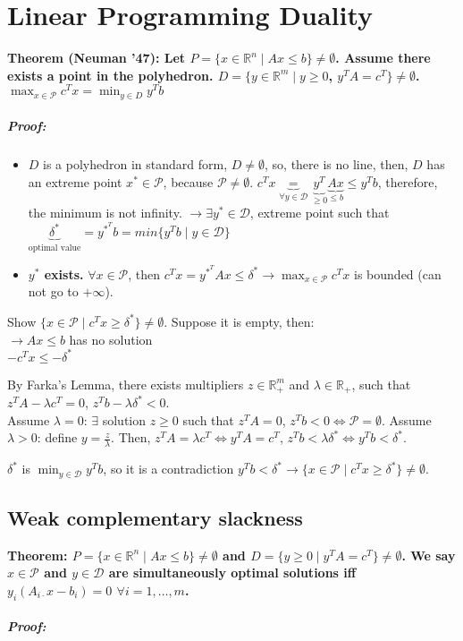 \documentclass[main]{subfiles}
\begin{document}

\section{Linear Programming Duality}

\textbf{Theorem (Neuman '47): Let $P = \{x \in \mathbb{R}^n \mid Ax \leq b \}
\neq \emptyset$. Assume there exists a point in the polyhedron. $D = \{ y \in
\mathbb{R}^m \mid y \geq 0$, $y^TA = c^T\} \neq \emptyset$.
\emph{$\displaystyle \max_{x \in \mathcal{P}} c^{T}x = \min_{y \in D} y^T b$ }}

\subparagraph{Proof:}
\begin{itemize}
\item $D$ is a polyhedron in standard form, $D \neq \emptyset$, so, there is no
line, then, $D$ has an extreme point $x^* \in \mathcal{P}$, because
$\mathcal{P} \neq \emptyset$. 
$c^T x \underbrace{=}_{\forall y \in \mathcal{D}} \underbrace{y^T}_{\geq 0}
\underbrace{Ax}_{\leq b} \leq y^T b$, therefore, the minimum is not infinity.
$\rightarrow \exists y^* \in \mathcal{D}$, extreme point such that
$\underbrace{\delta^*}_{\text{optimal value}} = y^{*^T} b = min\{y^T b \mid y
\in \mathcal{D}\}$
\item \textbf{$y^*$ exists.}
$\forall x \in \mathcal{P}$, then $c^T x = y^{*^T}Ax \leq \delta^* \rightarrow
\displaystyle \max_{x \in \mathcal{P}} c^{T}x$ is bounded (can not go to
$+\infty$).
\end{itemize}

Show $\{x \in\mathcal{P} \mid c^T x \geq \delta^* \} \neq \emptyset$. Suppose
it is empty, then:\\
$\rightarrow Ax \leq b$ has no solution \\
$-c^T x \leq -\delta^*$

By Farka's Lemma, there exists multipliers $z \in \mathbb{R}_{+}^{m}$ and
$\lambda \in \mathbb{R}_{+}$, such that $z^T A - \lambda c^T = 0$, $z^T b -
\lambda \delta^* < 0$.\\
Assume $\lambda = 0$: $\exists$ solution $z \geq 0$ such that $z^T A = 0$,
$z^T b < 0 \iff \mathcal{P} = \emptyset$.
Assume $\lambda > 0$: define $y = \frac{z}{\lambda}$. Then, $z^T A = \lambda 
c^T \iff y^T A = c^T$, $z^T b < \lambda \delta^* \iff y^T b < \delta^*$.

$\delta^*$ is $\displaystyle \min_{y \in \mathcal{D}} y^{T}b$, so it is a
contradiction $y^T b < \delta^* \rightarrow \{ x \in \mathcal{P} \mid c^T x 
\geq \delta^*\} \neq \emptyset$.

\subsection{Weak complementary slackness}
\textbf{Theorem: $P = \{x \in \mathbb{R}^n \mid Ax \leq b \} \neq \emptyset$
and $D = \{ y \geq 0 \mid y^T A = c^T \} \neq \emptyset$. We say $x \in
\mathcal{P}$ and $y \in \mathcal{D}$ are simultaneously optimal solutions iff
$y_i (A_{i\cdot}x - b_i) = 0$ $\forall i = 1, \dots, m$. }

\subparagraph{Proof:}
\end{document}
